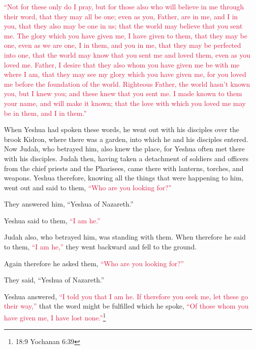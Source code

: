 \myverse{}\textcolor{crimson}{“Not for these only do I pray, but for those also who will
	believe in me through their word,
}
\myverse{}\textcolor{crimson}{that they may all be one; even as you, Father, are in me, and I in you,
	that they also may be one in us; that the world may believe that you sent me.
}
\myverse{}\textcolor{crimson}{The glory which you have given me, I have given to them, that they may
	be one, even as we are one,
}
\myverse{}\textcolor{crimson}{I in them, and you in me, that they may be perfected into one, that the
	world may know that you sent me and loved them, even as you loved me.
}
\myverse{}\textcolor{crimson}{Father, I desire that they also whom you have given me be with me where
	I am, that they may see my glory which you have given me, for you loved me before the foundation of the
	world.
}
\myverse{}\textcolor{crimson}{Righteous Father, the world hasn’t known you, but I knew you; and these
	knew that you sent me.
}
\myverse{}\textcolor{crimson}{I made known to them your name, and will make it known; that the love
	with which you loved me may be in them, and I in them.”}



 \myverse*{}When Yeshua had spoken these words, he went out with his disciples
over the brook Kidron, where there was a garden, into which he and his disciples entered.
\myverse{}Now Judah, who betrayed him, also knew the place, for Yeshua often met there
with his disciples.
\myverse{}Judah then, having taken a detachment of soldiers and officers from the chief
priests and the Pharisees, came there with lanterns, torches, and weapons.
\myverse{}Yeshua therefore, knowing all the things that were happening to him, went out
and said to them,
\textcolor{crimson}{“Who are you looking for?”}

\myverse{}They answered him, “Yeshua of Nazareth.”

Yeshua said to them,
\textcolor{crimson}{“I am he.”}

Judah also, who betrayed him, was standing with them.
\myverse{}When therefore he said to them,
\textcolor{crimson}{“I am he,”} they went backward and fell to the ground.

\myverse{}Again therefore he asked them,
\textcolor{crimson}{“Who are you looking for?”}

They said, “Yeshua of Nazareth.”

\myverse{}Yeshua answered,
\textcolor{crimson}{“I told you that I am he. If therefore you seek me, let these go their way,”}
\myverse{}that the word might be fulfilled which he spoke,
\textcolor{crimson}{“Of those whom you have given me, I have lost none.”}\footnote{18:9 Yochanan 6:39}

